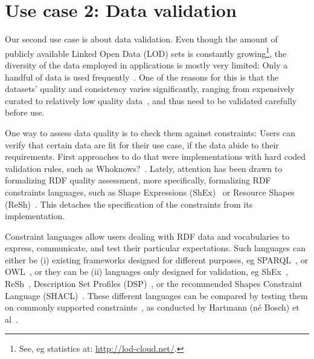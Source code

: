 \section{Use case 2: Data validation}
Our second use case is about data validation.
Even though the amount of publicly available Linked Open Data (LOD) sets is constantly growing\footnote{See, eg statistics at: \url{http://lod-cloud.net/}.}, 
the diversity of the data employed in applications is mostly very limited:
Only a handful of \rdf data is used frequently~\cite{rietveld2015lod}.
One of the reasons for this is that the datasets' quality and consistency varies significantly,
ranging from expensively curated to relatively low quality data~\cite{zaveri2015quality},
and thus need to be validated carefully before use.

One way to assess data quality is to check them against constraints: 
Users can verify that certain data are fit for their use case,
if the data abide to their requirements.
First approaches to do that were implementations with hard coded validation rules,
such as Whoknows?~\cite{ketterl2011whoknows}.
Lately, attention has been drawn to formalizing RDF quality assessment, more specifically,
formalizing RDF constraints languages, such as Shape Expressions (ShEx)~\cite{shex} or Resource Shapes (ReSh)~\cite{resh}.
This detaches the specification of the constraints from its implementation.

Constraint languages allow users dealing with RDF data and vocabularies
to express, communicate, and test their particular expectations.
Such languages can either be (i) existing frameworks designed for different purposes, eg 
 SPARQL~\cite{hartmann2016,kontokostas2014test},
or OWL~\cite{owlValidation},
or they can be (ii) languages only designed for validation, eg
ShEx~\cite{shex},
ReSh~\cite{resh},
Description Set Profiles (DSP)~\cite{dsp},
or the \wwwc recommended Shapes Constraint Language (SHACL)~\cite{shacl}.
These different languages can be compared
by testing them on commonly supported constraints~\cite{bosch2015rdf,kontokostas2014test},
as conducted by Hartmann (n\'e Bosch) et al~\cite{bosch2015}.

